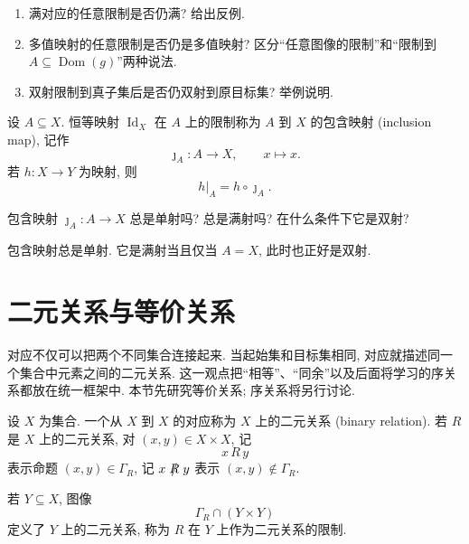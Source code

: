 \documentclass[usesamecnt, thmcnt=section, lang=cn, newtx, 10pt, scheme=chinese]{elegantbook}
\begin{document}
\begin{exercise}\label{ex:corr-restriction-properties}
\begin{enumerate}[label=\rm(\arabic*)]
  \item 满对应的任意限制是否仍满? 给出反例.
  \item 多值映射的任意限制是否仍是多值映射? 区分``任意图像的限制''和``限制到 $A\subseteq\operatorname{Dom}(g)$''两种说法.
  \item 双射限制到真子集后是否仍双射到原目标集? 举例说明.
\end{enumerate}
\end{exercise}

\begin{definition}[包含映射]\label{def:corr-inclusion-map}
设 $A\subseteq X$. 恒等映射 $\operatorname{Id}_X$ 在 $A$ 上的限制称为 $A$ 到 $X$ 的{\color{blue}包含映射 (inclusion map)}, 记作
\[
 \jmath_A:A\longrightarrow X,
 \qquad
 x\longmapsto x.
\]
若 $h:X\to Y$ 为映射, 则
\[
 h|_A=h\circ\jmath_A.
\]
\end{definition}

\begin{concept}\label{con:corr-13}
包含映射 $\jmath_A:A\to X$ 总是单射吗? 总是满射吗? 在什么条件下它是双射?
\end{concept}

\begin{solution}
包含映射总是单射. 它是满射当且仅当 $A=X$, 此时也正好是双射.
\end{solution}

\section{二元关系与等价关系}

对应不仅可以把两个不同集合连接起来. 当起始集和目标集相同, 对应就描述同一个集合中元素之间的二元关系. 这一观点把``相等''、``同余''以及后面将学习的序关系都放在统一框架中. 本节先研究等价关系; 序关系将另行讨论.

\begin{definition}[二元关系]\label{def:corr-binary-relation}
设 $X$ 为集合. 一个从 $X$ 到 $X$ 的对应称为 $X$ 上的{\color{blue}二元关系 (binary relation)}. 若 $R$ 是 $X$ 上的二元关系, 对 $(x,y)\in X\times X$, 记
\[
 x\,R\,y
\]
表示命题 $(x,y)\in\Gamma_R$, 记 $x\mathrel{\ooalign{\hfil$/$\hfil\cr\hfil$R$\hfil\cr}}y$ 表示 $(x,y)\notin\Gamma_R$.

若 $Y\subseteq X$, 图像
\[
 \Gamma_R\cap(Y\times Y)
\]
定义了 $Y$ 上的二元关系, 称为 $R$ 在 $Y$ 上作为二元关系的限制.
\end{definition}
\end{document}
